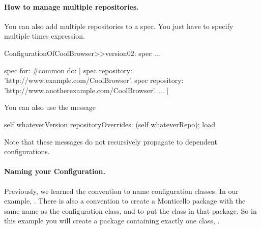 \documentclass[a4paper,10pt,twoside]{book}
\begin{document}
\paragraph{How to manage multiple repositories.}
You can also add multiple repositories to a spec. You just have to specify multiple times  expression.

\begin{code}{}
ConfigurationOfCoolBrowser>>version02: spec 
		...
       
		spec for: #common do: [
			spec repository: 'http://www.example.com/CoolBrowser'.
			spec repository: 'http://www.anotherexample.com/CoolBrowser'.
			...
			]
\end{code}

You can also use the message 

\begin{code}{}
self whateverVersion repositoryOverrides: (self whateverRepo); load
\end{code}

Note that these messages do not recursively propagate to dependent configurations.


\paragraph{Naming your Configuration.}

Previously, we learned the convention to name configuration classes. In our example, . There is also a convention to create a Monticello package with the same name as the configuration class, and to put the class in that package. So in this example you will create a package  containing exactly one class, . 
\end{document}
